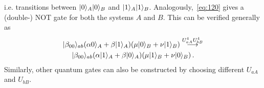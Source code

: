 \documentclass[12pt,a4paper]{article}
\begin{document}
i.e. transitions between $\arrowvert 0\rangle_A\arrowvert
0\rangle_B$ and $\arrowvert 1\rangle_A\arrowvert 1\rangle_B$. Analogously,~\eqref{eq:120} gives a (double-) NOT gate for both the systems $A$ and $B$. This can be verified generally as
\begin{multline}
\label{eq:121}
\arrowvert\beta_{00}\rangle_{ab}(\alpha
0\rangle_A+\beta\arrowvert 1\rangle_A)(\mu\arrowvert
0\rangle_B+\nu\arrowvert 1\rangle_B)
\stackrel{U_{aA}^4U_{bB}^4}{\longrightarrow} \\
\arrowvert\beta_{00}\rangle_{ab}(\alpha\arrowvert
1\rangle_A+\beta\arrowvert 0\rangle_A)(\mu\arrowvert
1\rangle_B+\nu\arrowvert 0\rangle_B)
\,.
\end{multline}
Similarly, other quantum gates can also be constructed by choosing different $U_{aA}$ and $U_{bB}$.
\end{document}
